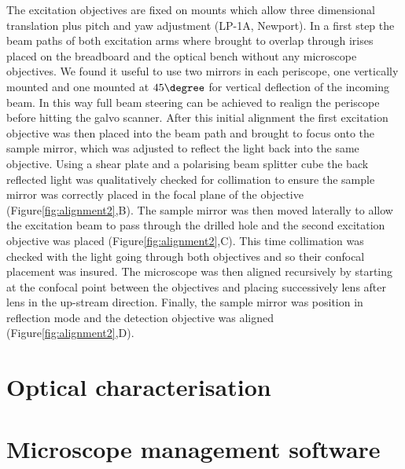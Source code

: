 \documentclass[12pt]{spieman}  %
\begin{document}
The excitation objectives are fixed on mounts which allow three dimensional translation plus pitch and yaw adjustment (LP-1A, Newport). In a first step the beam paths of both excitation arms where brought to overlap through irises placed on the breadboard and the optical bench without any microscope objectives. We found it useful to use two mirrors in each periscope, one vertically mounted and one mounted at $45\degree$ for vertical deflection of the incoming beam. In this way full beam steering can be achieved to realign the periscope before hitting the galvo scanner. After this initial alignment the first excitation objective was then placed into the beam path and brought to focus onto the sample mirror, which was adjusted to reflect the light back into the same objective. Using a shear plate and a polarising beam splitter cube the back reflected light was qualitatively checked for collimation to ensure the sample mirror was correctly placed in the focal plane of the objective (Figure\ref{fig:alignment2},B). The sample mirror was then moved laterally to allow the excitation beam to pass through the drilled hole and the second excitation objective was placed (Figure\ref{fig:alignment2},C). This time collimation was checked with the light going through both objectives and so their confocal placement was insured. The microscope was then aligned recursively by starting at the confocal point between the objectives and placing successively lens after lens in the up-stream direction. Finally, the sample mirror was position in reflection mode and the detection objective was aligned (Figure\ref{fig:alignment2},D). 

\section{Optical characterisation}
	
\section{Microscope management software}
\end{document}
